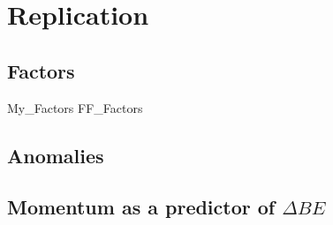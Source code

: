 
\section{Replication} \label{sec:repl}

\subsection{\textcite{fama2016dissecting, fama2016choosing} Factors} \label{sec:repl.FF2016}

{My_Factors}
{FF_Factors}

\subsection{\textcite{fama2016dissecting, fama2016choosing} Anomalies}

\subsection{\textcite{asness2013devil} Momentum as a predictor of $\Delta BE$}
